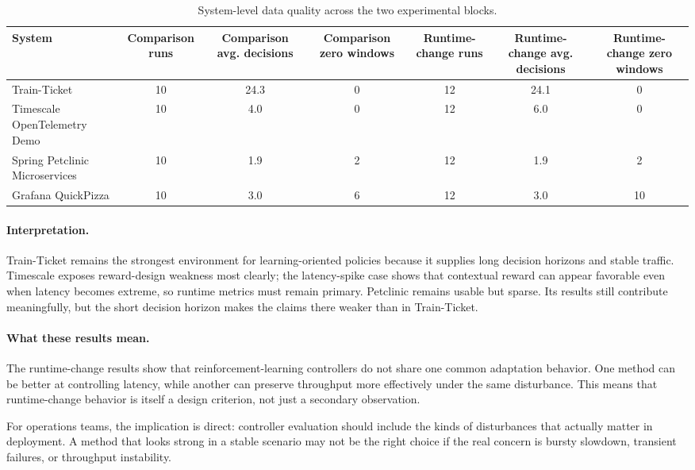 \documentclass[10pt,twocolumn]{article}
\begin{document}
\begin{table}[htbp]
\centering
\caption{System-level data quality across the two experimental blocks.}
\begin{tabularx}{\linewidth}{p{3.4cm}cccccc}
\toprule
System & Comparison runs & Comparison avg. decisions & Comparison zero windows & Runtime-change runs & Runtime-change avg. decisions & Runtime-change zero windows \\
\midrule
Train-Ticket & 10 & 24.3 & 0 & 12 & 24.1 & 0 \\
Timescale OpenTelemetry Demo & 10 & 4.0 & 0 & 12 & 6.0 & 0 \\
Spring Petclinic Microservices & 10 & 1.9 & 2 & 12 & 1.9 & 2 \\
Grafana QuickPizza & 10 & 3.0 & 6 & 12 & 3.0 & 10 \\
\bottomrule
\end{tabularx}
\end{table}

\paragraph{Interpretation.} Train-Ticket remains the strongest environment for learning-oriented policies because it supplies long decision horizons and stable traffic. Timescale exposes reward-design weakness most clearly; the latency-spike case shows that contextual reward can appear favorable even when latency becomes extreme, so runtime metrics must remain primary. Petclinic remains usable but sparse. Its results still contribute meaningfully, but the short decision horizon makes the claims there weaker than in Train-Ticket.

\paragraph{What these results mean.} The runtime-change results show that reinforcement-learning controllers do not share one common adaptation behavior. One method can be better at controlling latency, while another can preserve throughput more effectively under the same disturbance. This means that runtime-change behavior is itself a design criterion, not just a secondary observation.

For operations teams, the implication is direct: controller evaluation should include the kinds of disturbances that actually matter in deployment. A method that looks strong in a stable scenario may not be the right choice if the real concern is bursty slowdown, transient failures, or throughput instability.
\FloatBarrier
\end{document}
